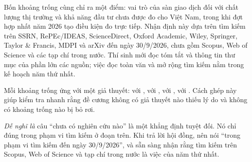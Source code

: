 Bốn khoảng trống cùng chỉ ra một điểm: vai trò của sàn giao dịch đối với chất lượng thị trường và khả năng đầu tư chưa được đo cho Việt Nam, trong khi đợt hợp nhất năm 2026 tạo điều kiện đo trực tiếp. Nhận định này dựa trên tìm kiếm trên SSRN, RePEc/IDEAS, ScienceDirect, Oxford Academic, Wiley, Springer, Taylor \& Francis, MDPI và arXiv đến ngày 30/9/2026, chưa gồm Scopus, Web of Science và các tạp chí trong nước. Thí sinh mới đọc tóm tắt và thông tin thư mục của phần lớn các nguồn; việc đọc toàn văn và mở rộng tìm kiếm nằm trong kế hoạch năm thứ nhất.

Mỗi khoảng trống ứng với một giả thuyết:  với ,  với ,  với ,  với . Cách ghép này giúp kiểm tra nhanh rằng đề cương không có giả thuyết nào thiếu lý do và không có khoảng trống nào bị bỏ rơi.

\begin{delam}
\emph{Dễ nghĩ là} câu \enquote{chưa có nghiên cứu nào} là một khẳng định tuyệt đối. Nó chỉ đúng trong phạm vi tìm kiếm ở đoạn trên. Khi trả lời hội đồng, nên nói \enquote{trong phạm vi tìm kiếm đến ngày 30/9/2026}, và sẵn sàng nhận rằng tìm kiếm trên Scopus, Web of Science và tạp chí trong nước là việc của năm thứ nhất.
\end{delam}

